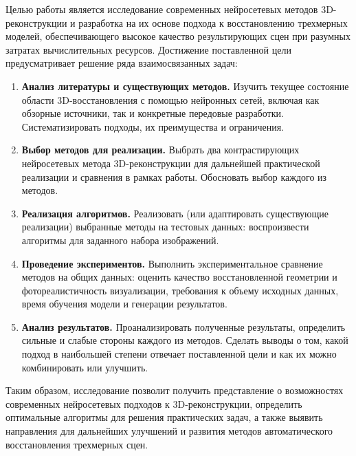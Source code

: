 Целью работы является исследование современных нейросетевых методов 3D-реконструкции
и разработка на их основе подхода к восстановлению трехмерных моделей,
обеспечивающего высокое качество результирующих сцен при разумных затратах
вычислительных ресурсов. Достижение поставленной цели предусматривает решение
ряда взаимосвязанных задач:

\begin{enumerate}

	\item \textbf{Анализ литературы и существующих методов.} Изучить текущее состояние
	области 3D-восстановления с помощью нейронных сетей, включая как обзорные
	источники, так и конкретные передовые разработки. Систематизировать подходы,
	их преимущества и ограничения.
	\item \textbf{Выбор методов для реализации.} Выбрать два контрастирующих
	нейросетевых метода 3D-реконструкции для дальнейшей практической реализации и
	сравнения в рамках работы. Обосновать выбор каждого из методов.
	\item \textbf{Реализация алгоритмов.} Реализовать (или адаптировать
	существующие реализации) выбранные методы на тестовых данных: воспроизвести
	алгоритмы для заданного набора изображений.
	\item \textbf{Проведение
	экспериментов.} Выполнить экспериментальное сравнение методов на общих данных:
	оценить качество восстановленной геометрии и фотореалистичность визуализации,
	требования к объему исходных данных, время обучения модели и генерации
	результатов.
	\item \textbf{Анализ результатов.} Проанализировать полученные
	результаты, определить сильные и слабые стороны каждого из методов. Сделать
	выводы о том, какой подход в наибольшей степени отвечает поставленной цели и
	как их можно комбинировать или улучшить.
	
\end{enumerate}

Таким образом, исследование позволит получить представление о
возможностях современных нейросетевых подходов к 3D-реконструкции, определить
оптимальные алгоритмы для решения практических задач, а также выявить
направления для дальнейших улучшений и развития методов автоматического
восстановления трехмерных сцен.
